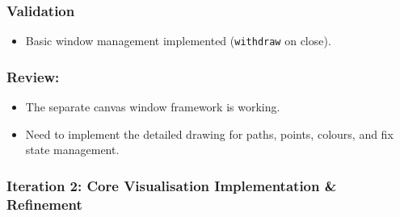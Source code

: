 \subsubsection{Validation}
\begin{itemize}
	\item Basic window management implemented (\verb|withdraw| on close).
\end{itemize}

\subsubsection{Review:}
\begin{itemize}
	\item The separate canvas window framework is working.
	\item Need to implement the detailed drawing for paths, points, colours, and fix state management.
\end{itemize}

\newpage

\subsubsection{Iteration 2: Core Visualisation Implementation \& Refinement}

